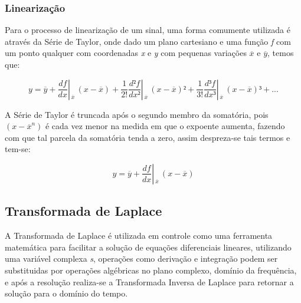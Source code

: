 \subsubsection{Linearização}

Para o processo de linearização de um sinal, uma forma comumente utilizada é através da Série de Taylor, onde dado um plano cartesiano e uma função \emph{f} com um ponto qualquer com coordenadas \emph{x} e \emph{y} com pequenas variações $\overline{x}$ e $\overline{y}$, temos que:

\begin{center}
\begin{equation}
y = \overline{y} + 
\frac{df}{dx} \left| \frac{ }{ } _{\overline{x}} \right. \, (x - \overline{x}) + 
\frac{1}{2!} \frac{d²f}{dx²} \left| \frac{ }{ } _{\overline{x}} \right. \, (x - \overline{x})² +
\frac{1}{3!} \frac{d³f}{dx³} \left| \frac{ }{ } _{\overline{x}} \right. \, (x - \overline{x})³ + ...
\label{eqn:SerieTaylor}
\end{equation}
\end{center}

A Série de Taylor é truncada após o segundo membro da somatória, pois $(x - \overline{x}^n )$ é cada vez menor na medida em que o expoente aumenta, fazendo com que tal parcela da somatória tenda a zero, assim despreza-se tais termos e tem-se:

\begin{center}
\begin{equation}
y = \overline{y} + 
\frac{df}{dx} \left| \frac{ }{ } _{\overline{x}} \right. \, (x - \overline{x})
\label{eqn:SerieTaylorTruncada}
\end{equation}
\end{center}



\subsection{Transformada de Laplace}
 
A Transformada de Laplace é utilizada em controle como uma ferramenta matemática para facilitar a solução de equações diferenciais lineares, utilizando uma variável complexa \emph{s}, operações como derivação e integração podem ser substituidas por operações algébricas no plano complexo, domínio da frequência, e após a resolução realiza-se a Transformada Inversa de Laplace para retornar a solução para o domínio do tempo.

